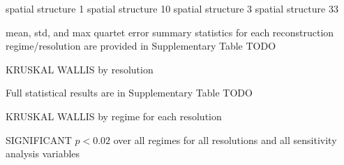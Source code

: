 spatial structure	1%
spatial structure	10%
spatial structure	3%
spatial structure	33%

mean, std, and max quartet error summary statistics for each reconstruction regime/resolution are provided in Supplementary Table TODO


KRUSKAL WALLIS by resolution
%
%
%

Full statistical results are in Supplementary Table TODO

KRUSKAL WALLIS by regime for each resolution

SIGNIFICANT $p < 0.02$ over all regimes for all resolutions and all sensitivity analysis variables
